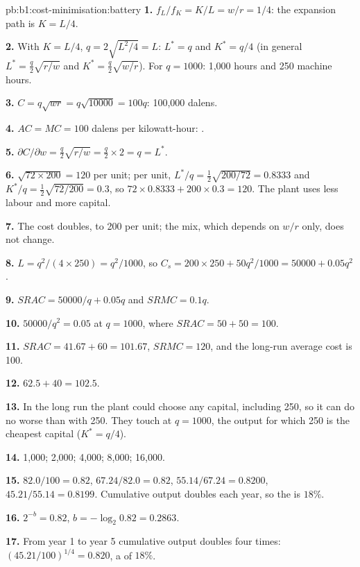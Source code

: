 \begin{solution}{pb:b1:cost-minimisation:battery}
\textbf{1.} $f_L/f_K = K/L = w/r = 1/4$: the expansion path is $K = L/4$.

\textbf{2.} With $K = L/4$, $q = 2\sqrt{L^2/4} = L$: $L^* = q$ and $K^* = q/4$ (in general
$L^* = \tfrac q2\sqrt{r/w}$ and $K^* = \tfrac q2\sqrt{w/r}$). For $q = 1000$: 1,000 hours and 250
machine hours.

\textbf{3.} $C = q\sqrt{wr} = q\sqrt{10000} = 100q$: 100,000 dalens.

\textbf{4.} $AC = MC = 100$ dalens per kilowatt-hour: .

\textbf{5.} $\partial C/\partial w = \tfrac q2\sqrt{r/w} = \tfrac q2 \times 2 = q = L^*$.

\textbf{6.} $\sqrt{72 \times 200} = 120$ per unit; per unit,
$L^*/q = \tfrac12\sqrt{200/72} = 0.8333$ and $K^*/q = \tfrac12\sqrt{72/200} = 0.3$, so
$72 \times 0.8333 + 200 \times 0.3 = 120$. The plant uses less labour and more capital.

\textbf{7.} The cost doubles, to 200 per unit; the mix, which depends on $w/r$
only, does not change.

\textbf{8.} $L = q^2/(4 \times 250) = q^2/1000$, so $C_s = 200 \times 250 + 50q^2/1000 = 50000 + 0.05q^2$.

\textbf{9.} $SRAC = 50000/q + 0.05q$ and $SRMC = 0.1q$.

\textbf{10.} $50000/q^2 = 0.05$ at $q = 1000$, where $SRAC = 50 + 50 = 100$.

\textbf{11.} $SRAC = 41.67 + 60 = 101.67$, $SRMC = 120$, and the long-run average
cost is 100.

\textbf{12.} $62.5 + 40 = 102.5$.

\textbf{13.} In the long run the plant could choose any capital, including
250, so it can do no worse than with 250. They touch at $q = 1000$, the
output for which 250 is the cheapest capital ($K^* = q/4$).

\textbf{14.} 1,000; 2,000; 4,000; 8,000; 16,000.

\textbf{15.} $82.0/100 = 0.82$, $67.24/82.0 = 0.82$, $55.14/67.24 = 0.8200$,
$45.21/55.14 = 0.8199$. Cumulative output doubles each year, so the  is $18\%$.

\textbf{16.} $2^{-b} = 0.82$, $b = -\log_2 0.82 = 0.2863$.

\textbf{17.} From year 1 to year 5 cumulative output doubles four times:
$(45.21/100)^{1/4} = 0.820$, a  of $18\%$.


\end{solution}
